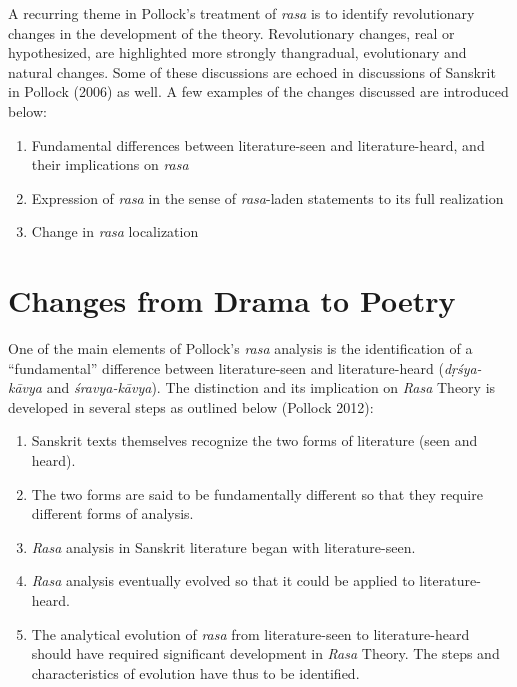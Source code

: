 A recurring theme in Pollock’s treatment of \textsl{rasa} is to identify revolutionary changes in the development of the theory. Revolutionary changes, real or hypothesized, are highlighted more strongly than\break gradual, evolutionary and natural changes. Some of these discussions are echoed in discussions of Sanskrit in Pollock (2006) as well. A few examples of the changes discussed are introduced below:
\begin{enumerate}
\itemsep=0pt
\item Fundamental differences between literature-seen and literature-heard, and their implications on \textsl{rasa }
\item Expression of \textsl{rasa} in the sense of \textsl{rasa}-laden statements to its full realization
\item Change in \textsl{rasa} localization
\end{enumerate}

\section*{Changes from Drama to Poetry}

One of the main elements of Pollock’s \textsl{rasa} analysis is the identification of a “fundamental” difference between literature-seen and literature-heard (\textsl{dṛśya-kāvya} and \textsl{śravya-kāvya}). The distinction and its implication on \textsl{Rasa} Theory is developed in several steps as outlined below (Pollock 2012):
\begin{enumerate}
\itemsep=1pt
\item Sanskrit texts themselves recognize the two forms of literature (seen and heard). 
\item The two forms are said to be fundamentally different so that they require different forms of analysis.
\item \textsl{Rasa }analysis in Sanskrit literature began with literature-seen.
\item \textsl{Rasa }analysis eventually evolved so that it could be applied to literature-heard.
\item The analytical evolution of \textsl{rasa} from literature-seen to literature-heard should have required significant development in \textsl{Rasa} Theory. The steps and characteristics of evolution have thus to be identified.
\end{enumerate}

